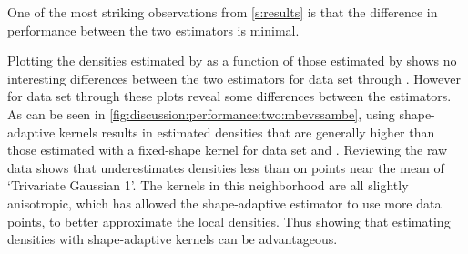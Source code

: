 
One of the most striking observations from \cref{s:results} is that the difference in performance between the two estimators is minimal. 
	
		Plotting the densities estimated by \sambe as a function of those estimated by \mbe shows no interesting differences between the two estimators for data set \ferdosiOne through \baakmanFive. 
		However for data set \ferdosiTwo through \baakmanThree these plots reveal some differences between the estimators. As can be seen in \cref{fig:discussion:performance:two:mbevssambe}, using shape-adaptive kernels results in estimated densities that are generally higher than those estimated with a fixed-shape kernel for data set \ferdosiTwo and \baakmanTwo. Reviewing the raw data shows that \sambe underestimates densities less than \mbe on points near the mean of `Trivariate Gaussian 1'. The kernels in this neighborhood are all slightly anisotropic, which has allowed the shape-adaptive estimator to use more data points, to better approximate the local densities. Thus showing that estimating densities with shape-adaptive kernels can be advantageous.
